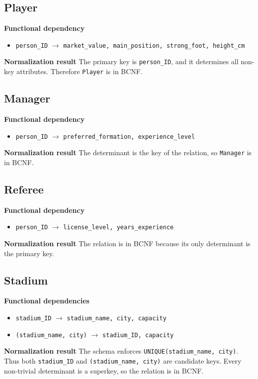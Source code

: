 \documentclass[12pt,a4paper]{article}
\begin{document}
\subsection{Player}
\textbf{Functional dependency}
\begin{itemize}
    \item \texttt{person\_ID} $\rightarrow$ \texttt{market\_value, main\_position, strong\_foot, height\_cm}
\end{itemize}
\textbf{Normalization result} The primary key is \texttt{person\_ID}, and it determines all non-key attributes. Therefore \texttt{Player} is in BCNF.

\subsection{Manager}
\textbf{Functional dependency}
\begin{itemize}
    \item \texttt{person\_ID} $\rightarrow$ \texttt{preferred\_formation, experience\_level}
\end{itemize}
\textbf{Normalization result} The determinant is the key of the relation, so \texttt{Manager} is in BCNF.

\subsection{Referee}
\textbf{Functional dependency}
\begin{itemize}
    \item \texttt{person\_ID} $\rightarrow$ \texttt{license\_level, years\_experience}
\end{itemize}
\textbf{Normalization result} The relation is in BCNF because its only determinant is the primary key.

\subsection{Stadium}
\textbf{Functional dependencies}
\begin{itemize}
    \item \texttt{stadium\_ID} $\rightarrow$ \texttt{stadium\_name, city, capacity}
    \item \texttt{(stadium\_name, city)} $\rightarrow$ \texttt{stadium\_ID, capacity}
\end{itemize}
\textbf{Normalization result} The schema enforces \texttt{UNIQUE(stadium\_name, city)}. Thus both \texttt{stadium\_ID} and \texttt{(stadium\_name, city)} are candidate keys. Every non-trivial determinant is a superkey, so the relation is in BCNF.
\end{document}

